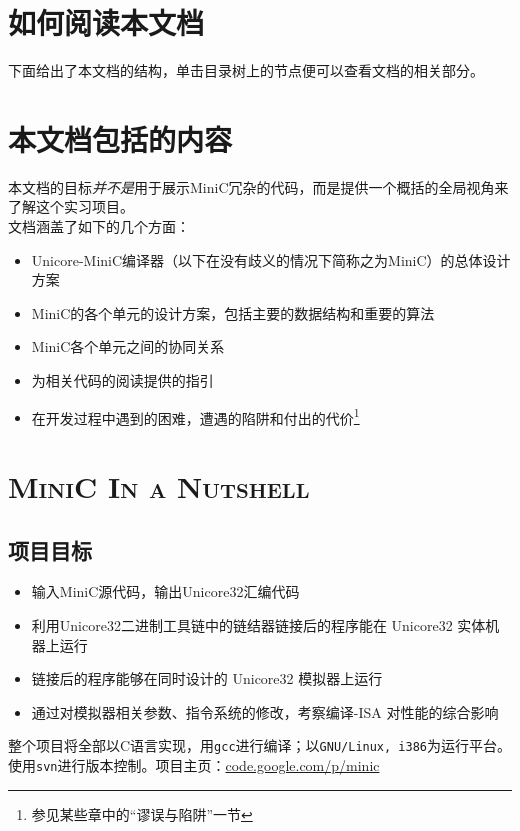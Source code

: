 \section*{如何阅读本文档}
下面给出了本文档的结构，单击目录树上的节点便可以查看文档的相关部分。
\label{pagetree}
\DTsetlength{1em}{5em}{0.3em}{1pt}{1.6pt}
\renewcommand*\DTstyle{\ttfamily}
\section*{本文档包括的内容}
本文档的目标\emph{并不是}用于展示MiniC冗杂的代码，而是提供一个概括的全局视角来了解这个实习项目。\\
文档涵盖了如下的几个方面：
\begin{itemize}
	\item Unicore-MiniC编译器（以下在没有歧义的情况下简称之为MiniC）的总体设计方案
	\item MiniC的各个单元的设计方案，包括主要的数据结构和重要的算法
	\item MiniC各个单元之间的协同关系
	\item 为相关代码的阅读提供的指引
	\item 在开发过程中遇到的困难，遭遇的陷阱和付出的代价\footnote{参见某些章中的“谬误与陷阱”一节}
\end{itemize}
\section*{\textsc{MiniC In a Nutshell}}
\subsection*{项目目标}
\begin{itemize}
	\item 输入MiniC源代码，输出Unicore32汇编代码
	\item 利用Unicore32二进制工具链中的链结器链接后的程序能在 Unicore32 实体机器上运行
	\item 链接后的程序能够在同时设计的 Unicore32 模拟器上运行
	\item 通过对模拟器相关参数、指令系统的修改，考察编译-ISA 对性能的综合影响
\end{itemize}
整个项目将全部以C语言实现，用\verb|gcc|进行编译；以\verb|GNU/Linux, i386|为运行平台。使用\verb|svn|进行版本控制。项目主页：\href{http://code.google.com/p/minic}{code.google.com/p/minic}
